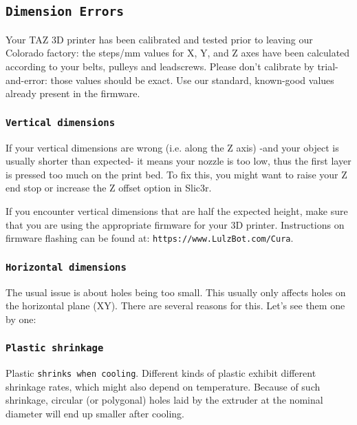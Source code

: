
\subsection{\texttt{Dimension Errors}}
\label{sec:dimension_errors}

Your TAZ 3D printer has been calibrated and tested prior to leaving our Colorado factory: the steps/mm values for X, Y, and Z axes have been calculated according to your belts, pulleys and leadscrews. Please don't calibrate by trial-and-error: those values should be exact. Use our standard, known-good values already present in the firmware.

\subsubsection{\texttt{Vertical dimensions}}

If your vertical dimensions are wrong (i.e. along the Z axis) -and your object is usually shorter than expected- it means your nozzle is too low, thus the first layer is pressed too much on the print bed. To fix this, you might want to raise your Z end stop or increase the Z offset option in Slic3r.

If you encounter vertical dimensions that are half the expected height, make sure that you are using the appropriate firmware for your 3D printer. Instructions on firmware flashing can be found at: \texttt{https://www.LulzBot.com/Cura}.

\subsubsection{\texttt{Horizontal dimensions}}

The usual issue is about holes being too small. This usually only affects holes on the horizontal plane (XY). There are several reasons for this. Let's see them one by one:

\subsubsection{\texttt{Plastic shrinkage}}

Plastic \texttt{shrinks when cooling}. Different kinds of plastic exhibit different shrinkage rates, which might also depend on temperature. Because of such shrinkage, circular (or polygonal) holes laid by the extruder at the nominal diameter will end up smaller after cooling.

